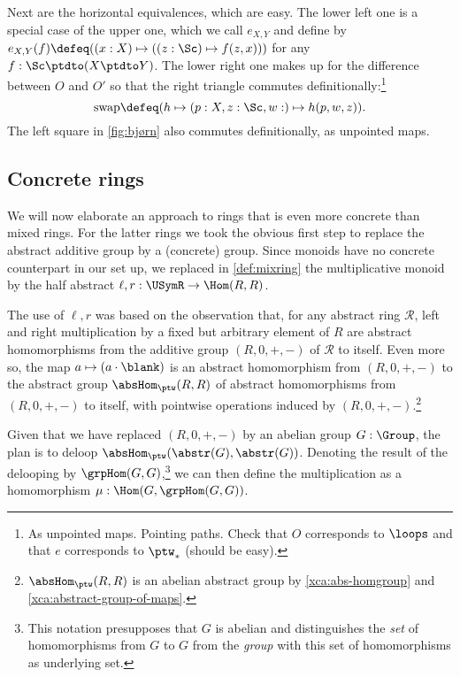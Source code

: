 \begin{remark}
Next are the horizontal equivalences, which are easy. The lower left one
is a special case of the upper one, which we call $e_{X,Y}$ and 
define by $e_{X,Y}(f) \defeq ((x:X) \mapsto ((z:\Sc) \mapsto f(z,x)))$ for
any $f:\Sc\ptdto (X\ptdto Y)$.
The lower right one makes up for the difference between $O$ and $O'$
so that the right triangle commutes definitionally:\footnote{%
As unpointed maps. 
Pointing paths. Check that $O$ corresponds to $\loops$
and that $e$ corresponds to $\ptw_*$ (should be easy).}
\[
\text{swap} \defeq (h\mapsto (p:\Scc X, z:\Sc,w:\Scc) \mapsto h(p,w,z)).
\]
The left square in \cref{fig:bjørn} also commutes definitionally,
as unpointed maps. 
\end{remark}


\subsection{Concrete rings}\label{sec:concrings}

We will now elaborate an approach to rings that is even more concrete
than mixed rings. For the latter rings we took the
obvious first step to replace the abstract additive group by a 
(concrete) group. Since monoids have no concrete counterpart in our set up,
we replaced in \cref{def:mixring} the multiplicative monoid 
by the half abstract $\ell,r:\USymR\to\Hom(R,R)$.

The use of $\ell,r$ was based on the observation that, 
for any abstract ring $\mathscr R$, left and right multiplication
by a fixed but arbitrary element of $R$ are 
abstract homomorphisms from the additive group $(R,0,+,-)$ of 
$\mathscr R$ to itself. 
Even more so, the map $a\mapsto(a\cdot\blank)$ is an abstract homomorphism
from $(R,0,+,-)$ to the abstract group $\absHom_{\ptw}(R,R)$
of abstract homomorphisms from $(R,0,+,-)$ to itself, with
pointwise operations induced by $(R,0,+,-)$.\footnote{%
$\absHom_{\ptw}(R,R)$ is an abelian abstract group by
\cref{xca:abs-homgroup} and \cref{xca:abstract-group-of-maps}.}

Given that we have replaced $(R,0,+,-)$ by an abelian group $G:\Group$,
the plan is to deloop $\absHom_{\ptw}(\abstr(G),\abstr(G))$. 
Denoting the result of the delooping by $\grpHom(G,G)$,\footnote{%
This notation presupposes that $G$ is abelian and distinguishes 
the \emph{set} of homomorphisms from $G$ to $G$ from the \emph{group}
with this set of homomorphisms as underlying set.}
we can then define the multiplication as a homomorphism
$\mu: \Hom(G,\grpHom(G,G))$.

